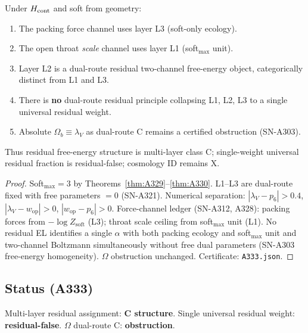 \begin{theorem}
\label{thm:A333}
Under $H_{\rm cont}$ and soft from geometry:
\begin{enumerate}[label=(\roman*)]
\item The packing force channel uses layer L3 (soft-only ecology).
\item The open throat \emph{scale} channel uses layer L1 (soft$_{\max}$ unit).
\item Layer L2 is a dual-route residual two-channel free-energy object, categorically distinct from L1 and L3.
\item There is \textbf{no} dual-route residual principle collapsing L1, L2, L3 to a single universal residual weight.
\item Absolute $\Omega_b\equiv\lambda_V$ as dual-route C remains a certified obstruction (SN-A303).
\end{enumerate}
Thus residual free-energy structure is multi-layer class C; single-weight universal residual fraction is residual-false; cosmology ID remains X.
\end{theorem}

\begin{proof}
Soft$_{\max}=3$ by Theorems~\ref{thm:A329}--\ref{thm:A330}.
L1--L3 are dual-route fixed with free parameters $=0$ (SN-A321).
Numerical separation: $|\lambda_V-p_6|>0.4$, $|\lambda_V-w_{\mathrm{op}}|>0$, $|w_{\mathrm{op}}-p_6|>0$.
Force-channel ledger (SN-A312, A328): packing forces from $-\log Z_{\mathrm{soft}}$ (L3); throat scale ceiling from soft$_{\max}$ unit (L1).
No residual EL identifies a single $\alpha$ with both packing ecology and soft$_{\max}$ unit and two-channel Boltzmann simultaneously without free dual parameters (SN-A303 free-energy homogeneity).
$\Omega$ obstruction unchanged.
Certificate: \texttt{A333.json}.
\end{proof}

\subsection*{Status (A333)}
Multi-layer residual assignment: \textbf{C structure}. Single universal residual weight: \textbf{residual-false}. $\Omega$ dual-route C: \textbf{obstruction}.

